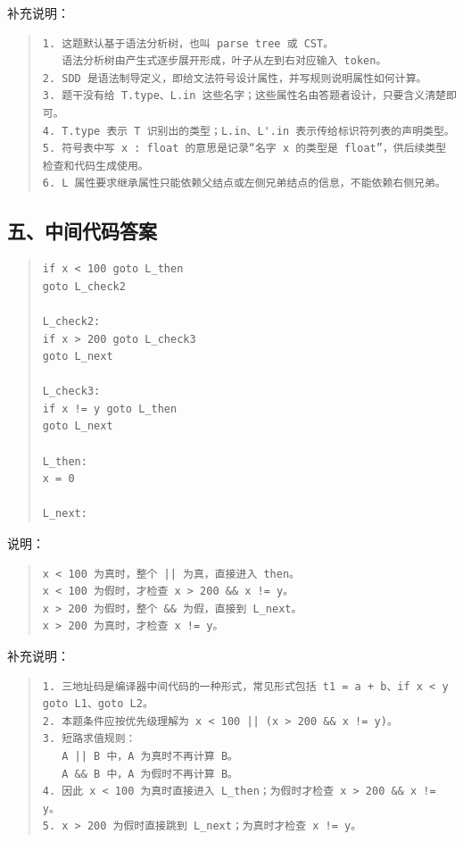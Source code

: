 \documentclass[UTF8,zihao=-4]{ctexart}
\begin{document}
补充说明：

\begin{quote}
\footnotesize
\begin{verbatim}
1. 这题默认基于语法分析树，也叫 parse tree 或 CST。
   语法分析树由产生式逐步展开形成，叶子从左到右对应输入 token。
2. SDD 是语法制导定义，即给文法符号设计属性，并写规则说明属性如何计算。
3. 题干没有给 T.type、L.in 这些名字；这些属性名由答题者设计，只要含义清楚即可。
4. T.type 表示 T 识别出的类型；L.in、L'.in 表示传给标识符列表的声明类型。
5. 符号表中写 x : float 的意思是记录“名字 x 的类型是 float”，供后续类型检查和代码生成使用。
6. L 属性要求继承属性只能依赖父结点或左侧兄弟结点的信息，不能依赖右侧兄弟。
\end{verbatim}
\end{quote}

\subsection*{五、中间代码答案}

\begin{quote}
\footnotesize
\begin{verbatim}
if x < 100 goto L_then
goto L_check2

L_check2:
if x > 200 goto L_check3
goto L_next

L_check3:
if x != y goto L_then
goto L_next

L_then:
x = 0

L_next:
\end{verbatim}
\end{quote}

说明：

\begin{quote}
\footnotesize
\begin{verbatim}
x < 100 为真时，整个 || 为真，直接进入 then。
x < 100 为假时，才检查 x > 200 && x != y。
x > 200 为假时，整个 && 为假，直接到 L_next。
x > 200 为真时，才检查 x != y。
\end{verbatim}
\end{quote}

补充说明：

\begin{quote}
\footnotesize
\begin{verbatim}
1. 三地址码是编译器中间代码的一种形式，常见形式包括 t1 = a + b、if x < y goto L1、goto L2。
2. 本题条件应按优先级理解为 x < 100 || (x > 200 && x != y)。
3. 短路求值规则：
   A || B 中，A 为真时不再计算 B。
   A && B 中，A 为假时不再计算 B。
4. 因此 x < 100 为真时直接进入 L_then；为假时才检查 x > 200 && x != y。
5. x > 200 为假时直接跳到 L_next；为真时才检查 x != y。
\end{verbatim}
\end{quote}
\end{document}
